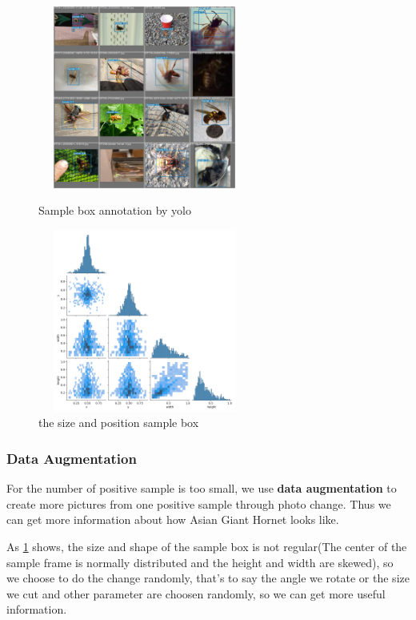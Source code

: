 \documentclass[12pt]{article}
\begin{document}
\begin{figure}[H]
	\small
	\centering
	\begin{minipage}{7cm}
		\includegraphics[width=7cm,height=6cm]{./pictures/machine1.png}
		\caption{Sample box annotation by yolo}\label{nt}
	\end{minipage}
	\begin{minipage}{7cm}
		\includegraphics[width=7cm,height=6cm]{./pictures/picture_correlogram.png}
		\caption{the size and position sample box\protect\footnotemark[1]}
		\label{box}
	\end{minipage}
\end{figure}




\subsubsection{Data Augmentation}
For the number of positive sample is too small, we use \textbf{data augmentation} to create more pictures from one positive sample through photo change. Thus we can get more information about how Asian Giant Hornet looks like.

As \ref{box} shows, the size and shape of the sample box is not regular(The center of the sample frame is normally distributed and the height and width are skewed), so we choose to do the change randomly, that's to say the angle we rotate or the size we cut and other parameter are choosen randomly, so we can get more useful information.
\end{document}
